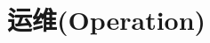 \documentclass[../../interview-questions.tex]{subfiles}
\begin{document}
\section{运维(Operation)}





\end{document}
